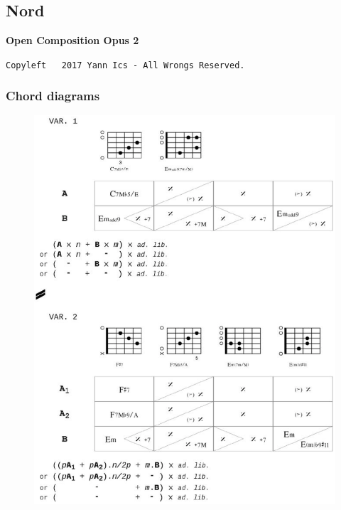 
\chapter*{}
\label{nord}

\section*{Nord}

\begin{center} 
\textbf{Open Composition Opus 2}
\label{oco2}

{\scriptsize  \texttt{Copyleft \textcopyleft \, 2017 Yann Ics - All Wrongs Reserved.}}
 \end{center} 
\vspace{-5mm}
\subsection*{\quad Chord diagrams}
\vspace{-5mm}
 \begin{figure}[H]
\begin{center}
\includegraphics[scale=0.66]{img/tn1}
\end{center}
\end{figure}


